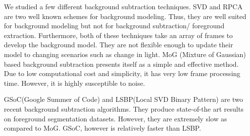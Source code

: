 We studied a few different background subtraction techniques. SVD\cite{chetverikov2010approximation} and RPCA\cite{candes2011robust} are two well known schemes for background modeling. Thus, they are well suited for background modeling but not for background subtraction/ foreground extraction. Furthermore, both of these techniques take an array of frames to develop the background model. They are not flexible enough to update their model to changing scenarios such as change in light. MoG (Mixture of Gaussian)\cite{zivkovic2006efficient} based background subtraction presents itself as a simple and effective method. Due to low computational cost and simplicity, it has very low frame processing time. However, it is highly susceptible to noise.

GSoC(Google Summer of Code)\cite{ref_gsoc} and LSBP(Local SVD Binary Pattern)\cite{guo2016background} are two recent background subtraction algorithms. They produce state-of-the art results on foreground segmentation datasets. However, they are extremely slow as compared to MoG. GSoC, however is relatively faster than LSBP.  





\newpage